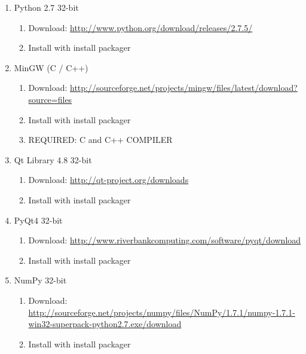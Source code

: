 \documentclass[a4paper,10pt]{article}
\begin{document}
        \begin{enumerate}
            \item Python 2.7 32-bit
                \begin{enumerate}
                    \item Download:
                        \url{http://www.python.org/download/releases/2.7.5/}
                    \item Install with install packager
                \end{enumerate}

            \item MinGW (C / C++) 
                \begin{enumerate}
                    \item Download: 
                        \url{http://sourceforge.net/projects/mingw/files/latest/download?source=files}
                    \item Install with install packager
                    \item REQUIRED: C and C++ COMPILER
                \end{enumerate}

            \item Qt Library 4.8 32-bit 
                \begin{enumerate}
                    \item Download: \url{http://qt-project.org/downloads}
                    \item Install with install packager
                \end{enumerate}

            \item PyQt4 32-bit 
                \begin{enumerate}
                    \item Download:
                        \url{http://www.riverbankcomputing.com/software/pyqt/download}
                    \item Install with install packager
                \end{enumerate}

            \item NumPy 32-bit 
                \begin{enumerate}
                    \item Download:
                        \url{http://sourceforge.net/projects/numpy/files/NumPy/1.7.1/numpy-1.7.1-win32-superpack-python2.7.exe/download}
                    \item Install with install packager
                \end{enumerate}


\end{enumerate}
\end{document}
